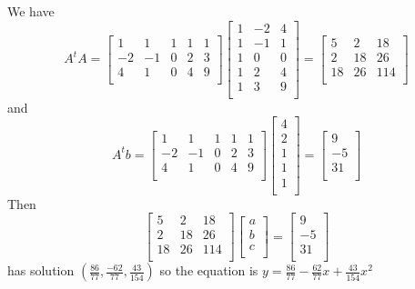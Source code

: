 \documentclass{article}
\begin{document}
\begin{example}
      We have \[
        A^tA =
        \begin{bmatrix}
          1 & 1 & 1 & 1 & 1\\
          -2 & -1 & 0 & 2 & 3\\
          4 & 1 & 0 & 4 & 9\\
        \end{bmatrix}
        \begin{bmatrix}
          1 & -2 & 4\\
          1 & -1 & 1\\
          1 & 0 & 0\\
          1 & 2 & 4\\
          1 & 3 & 9\\
        \end{bmatrix} =
        \begin{bmatrix}
          5 & 2 & 18\\
          2 & 18 & 26\\
          18 & 26 & 114\\
        \end{bmatrix}
      \] and \[
        A^tb =
        \begin{bmatrix}
          1 & 1 & 1 & 1 & 1\\
          -2 & -1 & 0 & 2 & 3\\
          4 & 1 & 0 & 4 & 9\\
        \end{bmatrix}
        \begin{bmatrix}
          4\\2\\1\\1\\1\\
        \end{bmatrix} =
        \begin{bmatrix}
          9\\-5\\31\\
        \end{bmatrix}
      \]
      Then \[
        \begin{bmatrix}
          5 & 2 & 18\\
          2 & 18 & 26\\
          18 & 26 & 114\\
        \end{bmatrix}
        \begin{bmatrix}
          a\\b\\c\\
        \end{bmatrix} =
        \begin{bmatrix}
          9\\-5\\31\\
        \end{bmatrix}
      \] has solution $\left(\frac{86}{77}, \frac{-62}{77}, \frac{43}{154}\right)$ so the equation is $y = \frac{86}{77} - \frac{62}{77}x + \frac{43}{154}x^2$
    \end{example}
\end{document}
